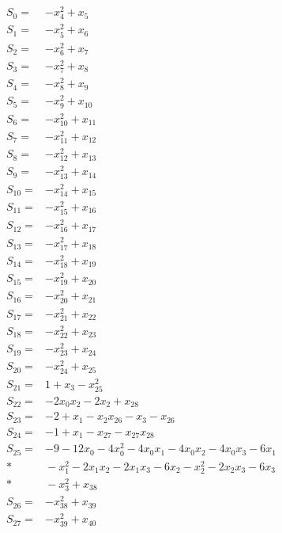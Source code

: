 \begingroup\small
\allowdisplaybreaks[4]
\setlength{\jot}{2pt}
\begin{align*}
S_{0}={}&-x_{4}^{2}+x_{5}\\[3pt]
S_{1}={}&-x_{5}^{2}+x_{6}\\[3pt]
S_{2}={}&-x_{6}^{2}+x_{7}\\[3pt]
S_{3}={}&-x_{7}^{2}+x_{8}\\[3pt]
S_{4}={}&-x_{8}^{2}+x_{9}\\[3pt]
S_{5}={}&-x_{9}^{2}+x_{10}\\[3pt]
S_{6}={}&-x_{10}^{2}+x_{11}\\[3pt]
S_{7}={}&-x_{11}^{2}+x_{12}\\[3pt]
S_{8}={}&-x_{12}^{2}+x_{13}\\[3pt]
S_{9}={}&-x_{13}^{2}+x_{14}\\[3pt]
S_{10}={}&-x_{14}^{2}+x_{15}\\[3pt]
S_{11}={}&-x_{15}^{2}+x_{16}\\[3pt]
S_{12}={}&-x_{16}^{2}+x_{17}\\[3pt]
S_{13}={}&-x_{17}^{2}+x_{18}\\[3pt]
S_{14}={}&-x_{18}^{2}+x_{19}\\[3pt]
S_{15}={}&-x_{19}^{2}+x_{20}\\[3pt]
S_{16}={}&-x_{20}^{2}+x_{21}\\[3pt]
S_{17}={}&-x_{21}^{2}+x_{22}\\[3pt]
S_{18}={}&-x_{22}^{2}+x_{23}\\[3pt]
S_{19}={}&-x_{23}^{2}+x_{24}\\[3pt]
S_{20}={}&-x_{24}^{2}+x_{25}\\[3pt]
S_{21}={}&1+x_{3}-x_{25}^{2}\\[3pt]
S_{22}={}&-2x_{0}x_{2}-2x_{2}+x_{28}\\[3pt]
S_{23}={}&-2+x_{1}-x_{2}x_{26}-x_{3}-x_{26}\\[3pt]
S_{24}={}&-1+x_{1}-x_{27}-x_{27}x_{28}\\[3pt]
S_{25}={}&-9-12x_{0}-4x_{0}^{2}-4x_{0}x_{1}-4x_{0}x_{2}-4x_{0}x_{3}-6x_{1}\\*
&{}-x_{1}^{2}-2x_{1}x_{2}-2x_{1}x_{3}-6x_{2}-x_{2}^{2}-2x_{2}x_{3}-6x_{3}\\*
&{}-x_{3}^{2}+x_{38}\\[3pt]
S_{26}={}&-x_{38}^{2}+x_{39}\\[3pt]
S_{27}={}&-x_{39}^{2}+x_{40}\\[3pt]

\end{align*}
